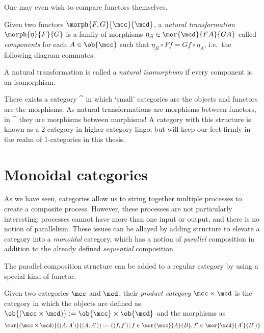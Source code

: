 One may even wish to compare functors themselves.

\begin{definition}
    Given two functors \(\morph{F, G}{\mcc}{\mcd}\), a
    \emph{natural transformation} \(\morph{\eta}{F}{G}\) is a family of
    morphisms \(
        \eta_A \in \mor{\mcd}{FA}{GA}
    \) called \emph{components} for each \(A \in \ob{\mcc}\) such that \(
        \eta_B \circ Ff = Gf \circ \eta_A
    \), i.e.\ the following diagram commutes:
    \begin{center}
        
    \end{center}
    A natural transformation is called a \emph{natural isomorphism} if
    every component is an isomorphism.
\end{definition}

\begin{remark}
    There exists a category \(\cat\) in which `small' categories are the objects
    and functors are the morphisms.
    As natural transformations are morphisms between functors, in \(\cat\) they
    are morphisms between morphisms!
    A category with this structure is known as a \(2\)-category in higher
    category lingo, but will keep our feet firmly in the realm of
    \(1\)-categories in this thesis.
\end{remark}

\section{Monoidal categories}

As we have seen, categories allow us to string together multiple processes to
create a composite process.
However, these processes are not particularly interesting: processes cannot have
more than one input or output, and there is no notion of parallelism.
These issues can be allayed by adding structure to elevate a category into a
\emph{monoidal} category, which has a notion of \emph{parallel} composition in
addition to the already defined \emph{sequential} composition.

The parallel composition structure can be added to a regular category by using
a special kind of functor.

\begin{definition}
    Given two categories \(\mcc\) and \(\mcd\), their \emph{product category}
    \(\mcc \times \mcd\) is the category in which the objects are defined as \(
        \ob{(\mcc \times \mcd)} := \ob{\mcc} \times \ob{\mcd}
    \) and the morphisms as \[
        \mor{(\mcc \times \mcd)}{(A, A^\prime)}{(A, A^\prime)}
        :=
        \{
            (f, f^\prime)
            \,|\,
            f \in \mor{\mcc}{A}{B},
            f^\prime \in \mor{\mcd}{A^\prime}{B^\prime}
        \}
    \]
\end{definition}

